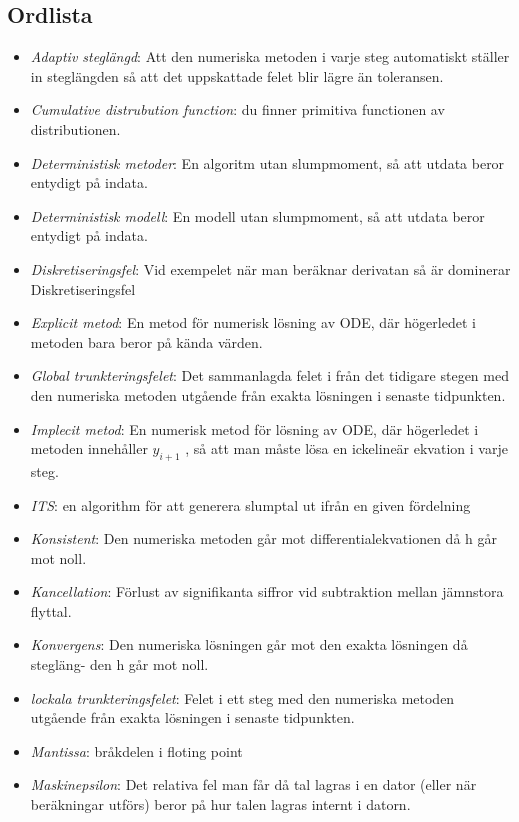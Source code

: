 \begin{multicols}{2}
\section{Ordlista}
\begin{itemize}
  \item \textit{Adaptiv steglängd}: Att den numeriska metoden i varje steg automatiskt ställer in
steglängden så att det uppskattade felet blir lägre än toleransen.
  \item \textit{Cumulative distrubution function}: du finner primitiva functionen av distributionen.
  \item \textit{Deterministisk metoder}: En algoritm utan slumpmoment, så att utdata beror entydigt på
indata.
  \item \textit{Deterministisk modell}: En modell utan slumpmoment, så att utdata beror entydigt på
indata.
  \item \textit{Diskretiseringsfel}: Vid exempelet när man beräknar derivatan så är
dominerar Diskretiseringsfel
  \item \textit{Explicit metod}: En metod för numerisk lösning av ODE, där högerledet i metoden
bara beror på kända värden.
  \item \textit{Global trunkteringsfelet}: Det sammanlagda felet i från det tidigare stegen med den numeriska metoden utgående från exakta
lösningen i senaste tidpunkten.
  \item \textit{Implecit metod}: En numerisk metod för lösning av ODE, där högerledet i metoden
innehåller $y_{i+1}$ , så att man måste lösa en ickelineär ekvation i varje
steg.
  \item \textit{ITS}: en algorithm för att generera slumptal ut ifrån en given fördelning
  \item \textit{Konsistent}: Den numeriska metoden går mot diﬀerentialekvationen då h går
mot noll.
 \item \textit{Kancellation}: Förlust av signifikanta siﬀror vid subtraktion mellan jämnstora
flyttal.
  \item \textit{Konvergens}: Den numeriska lösningen går mot den exakta lösningen då stegläng-
den h går mot noll.
  \item \textit{lockala trunkteringsfelet}: Felet i ett steg med den numeriska metoden utgående från exakta
lösningen i senaste tidpunkten.
  \item \textit{Mantissa}: bråkdelen i floting point
  \item \textit{Maskinepsilon}: Det relativa fel man får då tal lagras i en dator (eller när beräkningar utförs) beror på hur talen lagras internt i datorn.

\end{itemize}
\end{multicols}
